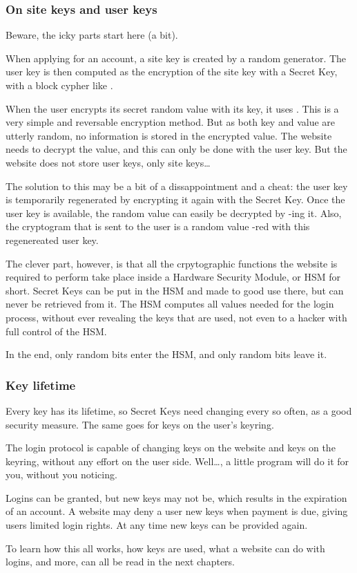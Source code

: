 \subsubsection{On site keys and user keys}
Beware, the icky parts start here (a bit).
\par
When applying for an account, a site key is created by a random generator.
The user key is then computed as the encryption of the site key with a Secret Key, with a block cypher like \AES.
\par
When the user encrypts its secret random value with its key,
it uses \XOR.
This is a very simple and reversable encryption method.
But as both key and value are utterly random, no information is stored in the encrypted value.
The website needs to decrypt the value, and this can only be done with the user key.
But the website does not store user keys, only site keys\ldots
\par
The solution to this may be a bit of a dissappointment and a cheat:
the user key is temporarily regenerated by encrypting it again with the Secret Key.
Once the user key is available, the random value can easily be decrypted by \XOR-ing it.
Also, the cryptogram that is sent to the user is a random value \XOR-red with this regenereated user key.
\par
The clever part,
however,
is that all the crpytographic functions the website is required to perform take place inside a Hardware Security Module,
or HSM for short.
Secret Keys can be put in the HSM and made to good use there,
but can never be retrieved from it.
The HSM computes all values needed for the login process,
without ever revealing the keys that are used,
not even to a hacker with full control of the HSM.
\par
In the end,
only random bits enter the HSM,
and only random bits leave it.

\subsubsection{Key lifetime}
Every key has its lifetime, so Secret Keys need changing every so often, as a good security measure.
The same goes for keys on the user's keyring.
\par
The login protocol is capable of changing keys on the website and keys on the keyring,
without any effort on the user side.
Well\ldots, a little program will do it for you, without you noticing.
\par
Logins can be granted,
but new keys may not be,
which results in the expiration of an account.
A website may deny a user new keys when payment is due,
giving users limited login rights.
At any time new keys can be provided again.
\par\vspace{10mm}\noindent
To learn how this all works,
how keys are used,
what a website can do with logins,
and more,
can all be read in the next chapters.
